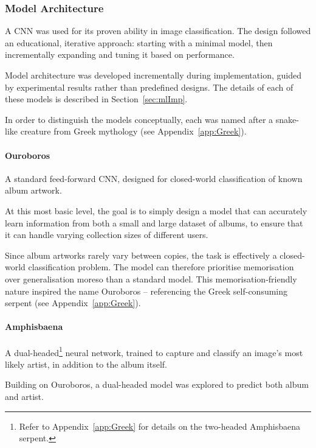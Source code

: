             \subsubsection{Model Architecture}
    
                A CNN was used for its proven ability in image classification. The design followed an educational, iterative approach: starting with a minimal model, then incrementally expanding and tuning it based on performance.
                
                Model architecture was developed incrementally during implementation, guided by experimental results rather than predefined designs. The details of each of these models is described in Section~\ref{sec:mlImp}.
    
                In order to distinguish the models conceptually, each was named after a snake-like creature from Greek mythology (see Appendix~\ref{app:Greek}).
    
                \paragraph{Ouroboros} A standard feed-forward CNN, designed for closed-world classification of known album artwork.
    
                At this most basic level, the goal is to simply design a model that can accurately learn information from both a small and large dataset of albums, to ensure that it can handle varying collection sizes of different users.
    
                Since album artworks rarely vary between copies, the task is effectively a closed-world classification problem. The model can therefore prioritise memorisation over generalisation moreso than a standard model. This memorisation-friendly nature inspired the name Ouroboros -- referencing the Greek self-consuming serpent (see Appendix~\ref{app:Greek}).
    
                \paragraph{Amphisbaena} A dual-headed\footnote{Refer to Appendix~\ref{app:Greek} for details on the two-headed Amphisbaena serpent.} neural network, trained to capture and classify an image's most likely artist, in addition to the album itself.
    
                Building on Ouroboros, a dual-headed model was explored to predict both album and artist.
    
